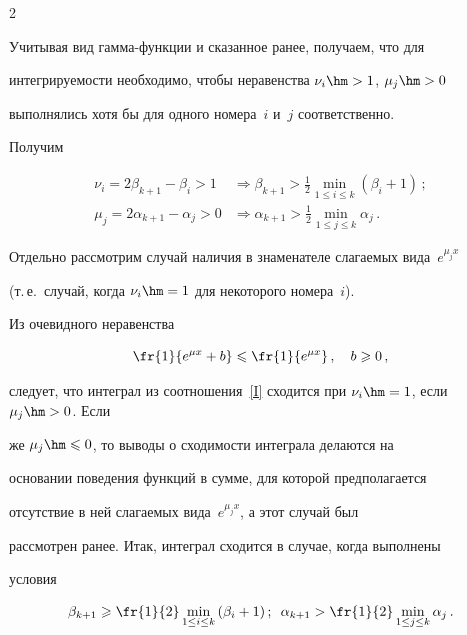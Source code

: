 \begin{multicols}{2}
\begin{equation*}
\end{equation*}



Учитывая вид гамма-функ\-ции и сказанное ранее, получаем, что для

интегрируемости необходимо, чтобы неравенства $\nu_i\hm>1$, $\mu_j\hm>0$

выполнялись хотя бы для одного номера~$i$ и~$j$ соответственно.

Получим

\begin{align*}

\nu_i=2\beta_{k+1}-\beta_i>1&\Rightarrow\beta_{k+1}>\frac12\min\limits_{1\le

i\le k}

{(\beta_i+1)}\,;\\

\mu_j=2\alpha_{k+1}-\alpha_j>0&\Rightarrow\alpha_{k+1}>\frac12\min\limits_{1\le

j\le k}{\alpha_j}\,.

\end{align*}



Отдельно рассмотрим случай наличия  в знаменателе слагаемых вида~$e^{\mu_j x}$ 

(т.\,е.\ случай, когда $\nu_i\hm=1$ для некоторого номера~$i$). 

Из очевидного неравенства 

$$

\fr{1}{e^{\mu x}+b}\leqslant\fr{1}{e^{\mu x}}\,,\quad b\geqslant0\,,

$$ 

следует, что интеграл из соотношения~\eqref{I} сходится при $\nu_i\hm=1$, если $\mu_j\hm>0$. Если

же $\mu_j\hm\leqslant0$, то выводы о сходимости интеграла делаются на

основании поведения функций в сумме, для которой предполагается

отсутствие в ней слагаемых вида~$e^{\mu_j x}$, а этот случай был

рассмотрен ранее. Итак, интеграл сходится в случае, когда выполнены

условия

$$ %

\beta_{k+1}\geqslant\fr{1}{2}\min\limits_{1\le i\le

k}{(\beta_i+1)}\,;\enskip \alpha_{k+1}>\fr{1}{2}\min\limits_{1\le j\le k}{\alpha_j}\,.

$$




\end{multicols}
